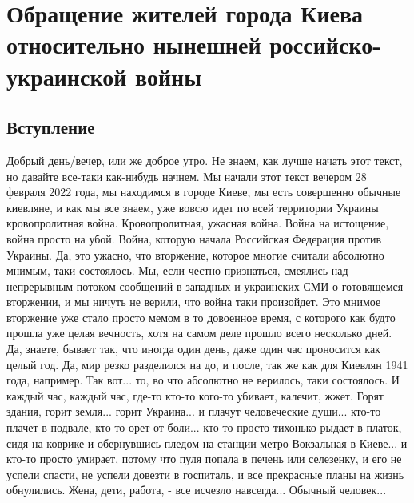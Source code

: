  
 
 
 
 

\section{Обращение жителей города Киева относительно нынешней российско-украинской войны}

\subsection{Вступление}

Добрый день/вечер, или же доброе утро. Не знаем, как лучше начать этот текст,
но давайте все-таки как-нибудь начнем. Мы начали этот текст вечером 28 февраля
2022 года, мы находимся в городе Киеве, мы есть совершенно обычные киевляне, и
как мы все знаем, уже вовсю идет по всей территории Украины кровопролитная
война. Кровопролитная, ужасная война.  Война на истощение, война просто на
убой. Война, которую начала Российская Федерация против Украины. Да, это
ужасно, что вторжение, которое многие считали абсолютно мнимым, таки
состоялось. Мы, если честно признаться, смеялись над непрерывным потоком
сообщений в западных и украинских СМИ о готовящемся вторжении, и мы ничуть не
верили, что война таки произойдет. Это мнимое вторжение уже стало просто мемом
в то довоенное время, с которого как будто прошла уже целая вечность, хотя на
самом деле прошло всего несколько дней. Да, знаете, бывает так, что иногда один
день, даже один час проносится как целый год. Да, мир резко разделился на до, и
после, так же как для Киевлян 1941 года, например. Так вот... то, во что
абсолютно не верилось, таки состоялось. И каждый час, каждый час, где-то кто-то
кого-то убивает, калечит, жжет. Горят здания, горит земля... горит Украина...
и плачут человеческие души...  кто-то плачет в подвале, кто-то орет от боли...
кто-то просто тихонько рыдает в платок, сидя на коврике и обернувшись пледом на
станции метро Вокзальная в Киеве... и кто-то просто умирает, потому что пуля
попала в печень или селезенку, и его не успели спасти, не успели довезти в
госпиталь, и все прекрасные планы на жизнь обнулились.  Жена, дети, работа, -
все исчезло навсегда... Обычный человек...

